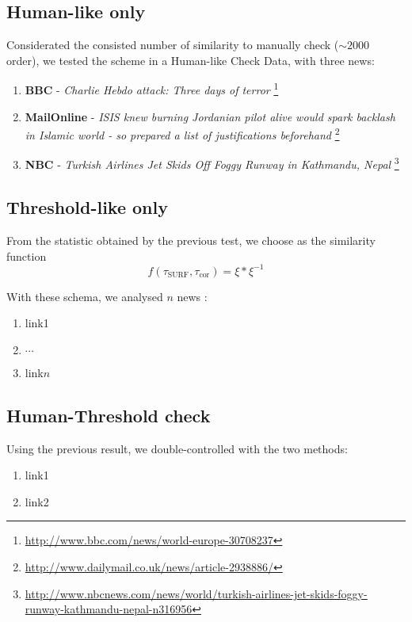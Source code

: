 \documentclass[10pt, journal,twocolumn]{IEEEtran}
\begin{document}
\subsection{Human-like only}

Considerated the consisted number of similarity to manually check ($\sim 2000$ order), we tested the scheme in a Human-like Check Data, with three news:

\begin{enumerate}
  \item \textbf{BBC} - \emph{Charlie Hebdo attack: Three days of terror} \footnote{\url{http://www.bbc.com/news/world-europe-30708237}}
  \item \textbf{MailOnline} - \emph{ISIS knew burning Jordanian pilot alive would spark backlash in Islamic world - so prepared a list of justifications beforehand} \footnote{\url{http://www.dailymail.co.uk/news/article-2938886/}}
  \item \textbf{NBC} - \emph{Turkish Airlines Jet Skids Off Foggy Runway in Kathmandu, Nepal} \footnote{\url{http://www.nbcnews.com/news/world/turkish-airlines-jet-skids-foggy-runway-kathmandu-nepal-n316956}}
\end{enumerate}


\subsection{Threshold-like only}


From the statistic obtained by the previous test, we choose as the similarity function
\[ f(\tau_{\text{SURF}} , \tau_{\text{cor}}) = \xi * \xi^{-1} \]

With these schema, we analysed $n$ news :
\begin{enumerate}
  \item link1
  \item $\cdots$
  \item link$n$
\end{enumerate}

\subsection{Human-Threshold check}

Using the previous result, we double-controlled with the two methods:

\begin{enumerate}
  \item link1
  \item link2
\end{enumerate}
\end{document}
